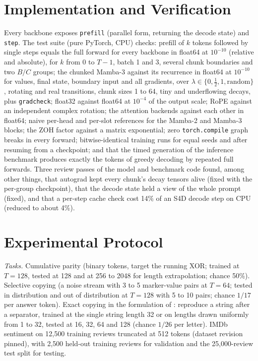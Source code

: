 \documentclass[conference]{IEEEtran}
\newcommand{\mamba}{Mamba}
\begin{document}
\section{Implementation and Verification}
\label{sec:impl}
Every backbone exposes \texttt{prefill} (parallel form, returning the decode
state) and \texttt{step}. The test suite (pure PyTorch, CPU) checks:
prefill of $k$ tokens followed by single steps equals the full forward for
every backbone in float64 at $10^{-10}$ (relative and absolute), for $k$ from
0 to $T-1$, batch 1 and 3, several chunk boundaries and two $B/C$ groups; the
chunked \mamba{}-3 against its recurrence in float64 at $10^{-10}$ for values,
final state, boundary input and all gradients, over
$\lambda\in\{0,\tfrac12,1,\text{random}\}$, rotating and real transitions,
chunk sizes 1 to 64, tiny and underflowing decays, plus \texttt{gradcheck};
float32 against float64 at $10^{-4}$ of the output scale; RoPE against an
independent complex rotation; the attention backends against each other in
float64; naive per-head and per-slot references for the \mamba{}-2 and
\mamba{}-3 blocks; the ZOH factor against a matrix exponential; zero
\texttt{torch.compile} graph breaks in every forward; bitwise-identical
training runs for equal seeds and after resuming from a checkpoint; and that
the timed generation of the inference benchmark produces exactly the tokens of
greedy decoding by repeated full forwards. Three review passes of the model
and benchmark code found, among other things, that autograd kept every chunk's
decay tensors alive (fixed with the per-group checkpoint), that the decode
state held a view of the whole prompt (fixed), and that a per-step cache check
cost 14\% of an S4D decode step on CPU (reduced to about 4\%).

\section{Experimental Protocol}
\label{sec:protocol}
\emph{Tasks.} Cumulative parity (binary tokens, target the running XOR; trained
at $T=128$, tested at 128 and at 256 to 2048 for length extrapolation; chance
50\%). Selective copying (a noise stream with 3 to 5 marker-value pairs at
$T=64$; tested in distribution and out of distribution at $T=128$ with 5 to 10
pairs; chance $1/17$ per answer token). Exact copying in the formulation of
\cite{jelassi2024repeat}: reproduce a string after a separator, trained at the
single string length 32 or on lengths drawn uniformly from 1 to 32, tested at
16, 32, 64 and 128 (chance $1/26$ per letter). IMDb sentiment on 12{,}500
training reviews truncated at 512 tokens (dataset revision pinned), with 2{,}500
held-out training reviews for validation and the 25{,}000-review test split
for testing.
\end{document}
